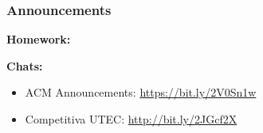 \documentclass{beamer}
\begin{document}
\begin{frame}
    \frametitle{Announcements}

    \textbf{Homework:}

    \textbf{Chats:}
    \begin{itemize}
        \item ACM Announcements: \url{https://bit.ly/2V0Sn1w}
        \item Competitiva UTEC: \url{http://bit.ly/2JGcf2X}
    \end{itemize}
\end{frame}
\end{document}
